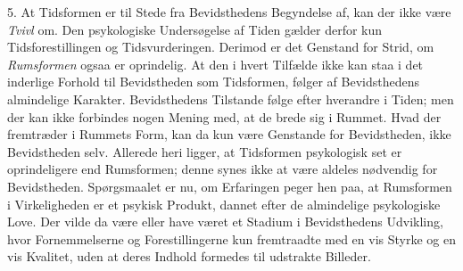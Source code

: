 \documentclass[12pt,a4paper,openany]{book}
\newcommand{\opage}[1]{\marginnote{\footnotesize\textit{[#1]}}}
\begin{document}
5. At Tidsformen er til Stede fra Bevidsthedens Begyndelse af, kan der
ikke være \emph{Tvivl} om. Den psykologiske Undersøgelse af Tiden gælder
derfor kun Tidsforestillingen og Tidsvurderingen. Derimod er det
Genstand for Strid, om \emph{Rumsformen} ogsaa er oprindelig. At den i
hvert Tilfælde
\opage{235}ikke kan staa i det inderlige Forhold til Bevidstheden som
Tidsformen, følger af Bevidsthedens almindelige Karakter. Bevidsthedens
Tilstande følge efter hverandre i Tiden; men der kan ikke forbindes
nogen Mening med, at de brede sig i Rummet. Hvad der fremtræder i
Rummets Form, kan da kun være Genstande for Bevidstheden, ikke
Bevidstheden selv. Allerede heri ligger, at Tidsformen psykologisk set
er oprindeligere end Rumsformen; denne synes ikke at være aldeles
nødvendig for Bevidstheden. Spørgsmaalet er nu, om Erfaringen peger hen
paa, at Rumsformen i Virkeligheden er et psykisk Produkt, dannet efter
de almindelige psykologiske Love. Der vilde da være eller have været et
Stadium i Bevidsthedens Udvikling, hvor Fornemmelserne og
Forestillingerne kun fremtraadte med en vis Styrke og en vis Kvalitet,
uden at deres Indhold formedes til udstrakte Billeder.
\end{document}
